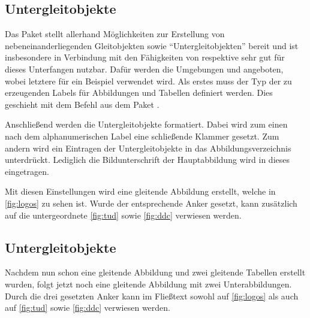 \documentclass[%
  english,ngerman,%
  geometry=no,DIV=12,automark,%
]{tudscrartcl}
\begin{document}
\begin{table}
\end{table}


\subsection{Untergleitobjekte}
\label{sec:subfloats}
Das Paket  stellt allerhand Möglichkeiten zur Erstellung von 
nebeneinanderliegenden Gleitobjekten sowie \enquote{Untergleitobjekten} bereit 
und ist insbesondere in Verbindung mit den Fähigkeiten von  
respektive  sehr gut für dieses Unterfangen nutzbar. Dafür 
werden die Umgebungen  und  
angeboten, wobei letztere für ein Beispiel verwendet wird. Als erstes muss der 
Typ der zu erzeugenden Labels für Abbildungen und Tabellen definiert werden. 
Dies geschieht mit dem Befehl  aus dem Paket 
.
%
\begin{Preamble}
\end{Preamble}
%
Anschließend werden die Untergleitobjekte formatiert. Dabei wird zum einen nach 
dem alphanumerischen Label eine schließende Klammer gesetzt. Zum andern wird 
ein Eintragen der Untergleitobjekte in das Abbildungsverzeichnis unterdrückt. 
Lediglich die Bildunterschrift der Hauptabbildung wird in dieses eingetragen.
%
\begin{Preamble*}
\captionsetup[subfloat]{labelformat=brace,list=off}

\end{Preamble*}
%
Mit diesen Einstellungen wird eine gleitende Abbildung erstellt, welche in 
\autoref{fig:logos} zu sehen ist. Wurde der entsprechende Anker gesetzt, kann 
zusätzlich auf die untergeordnete \autoref{fig:tud} sowie \autoref{fig:ddc} 
verwiesen werden.
%
\begin{Trunk+}
\subsection{Untergleitobjekte}
Nachdem nun schon eine gleitende Abbildung und zwei gleitende Tabellen 
erstellt wurden, folgt jetzt noch eine gleitende Abbildung mit zwei 
Unterabbildungen. Durch die drei gesetzten Anker kann im Fließtext 
sowohl auf \autoref{fig:logos} als auch auf \autoref{fig:tud} sowie 
\autoref{fig:ddc} verwiesen werden.

\end{Trunk+}
\end{document}
